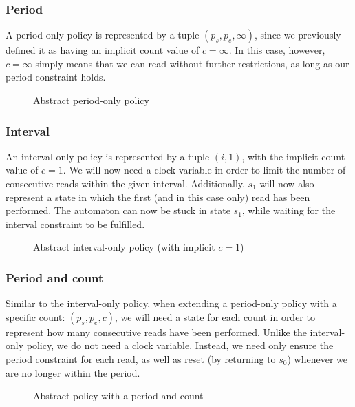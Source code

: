 \subsubsection{Period}
A period-only policy is represented by a tuple $(p_s, p_e, \infty)$, since we previously defined it as having an implicit count value of $c = \infty$.
In this case, however, $c = \infty$ simply means that we can read without further restrictions, as long as our period constraint holds.

\begin{figure}[H]
  \centering
  
  \caption{Abstract period-only policy}
\end{figure}

\subsubsection{Interval}
An interval-only policy is represented by a tuple $(i, 1)$, with the implicit count value of $c = 1$.
We will now need a clock variable in order to limit the number of consecutive reads within the given interval.
Additionally, $s_1$ will now also represent a state in which the first (and in this case only) read has been performed.
The automaton can now be stuck in state $s_1$, while waiting for the interval constraint to be fulfilled.

\begin{figure}[H]
  \centering
  
  \caption{Abstract interval-only policy (with implicit $c = 1$)}
\end{figure}

\subsubsection{Period and count}
Similar to the interval-only policy, when extending a period-only policy with a specific count: $(p_s, p_e, c)$, we will need a state for each count in order to represent how many consecutive reads have been performed.
Unlike the interval-only policy, we do not need a clock variable.
Instead, we need only ensure the period constraint for each read, as well as reset (by returning to $s_0$) whenever we are no longer within the period.

\begin{figure}[H]
  \centering
  
  \caption{Abstract policy with a period and count}
\end{figure}

